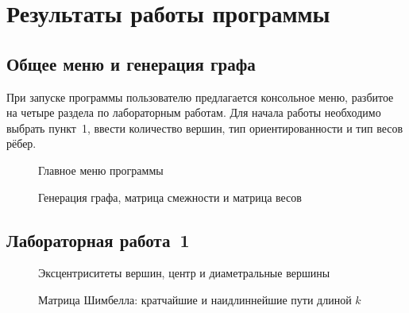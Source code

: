 \section{Результаты работы программы}

\subsection{Общее меню и генерация графа}

При запуске программы пользователю предлагается консольное меню,
разбитое на четыре раздела по лабораторным работам. Для начала работы
необходимо выбрать пункт~1, ввести количество вершин, тип ориентированности
и тип весов рёбер.

\begin{figure}[h]
    \centering
    \caption{Главное меню программы}
\end{figure}

\begin{figure}[h]
    \centering
    \caption{Генерация графа, матрица смежности и матрица весов}
\end{figure}

\subsection{Лабораторная работа~1}

\begin{figure}[h]
    \centering
    \caption{Эксцентриситеты вершин, центр и диаметральные вершины}
\end{figure}

\begin{figure}[h]
    \centering
    \caption{Матрица Шимбелла: кратчайшие и наидлиннейшие пути длиной $k$}
\end{figure}

